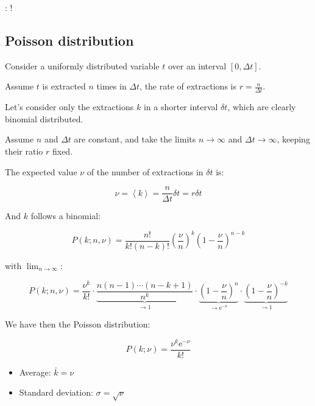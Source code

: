 : !

\subsection{Poisson distribution}
\label{subsec:poisson_distr}

Consider a uniformly distributed variable $t$ over an interval $[0, \Delta t]$.


Assume $t$ is extracted $n$ times in $\Delta t$, the rate of extractions is $r = \frac{n}{\Delta t}$.

Let's consider only the extractions $k$ in a shorter interval $\delta t$, which are clearly binomial distributed. 

Assume $n$ and $\Delta t$ are constant, and take the limits $n \to \infty$ and $\Delta t \to \infty$, keeping their ratio $r$ fixed.

The expected value $\nu$ of the number of extractions in $\delta t$ is:

$$
\nu = \left \langle k \right \rangle = \frac{n}{\Delta t} \delta t = r \delta t
$$

And $k$ follows a binomial:

$$
P(k ; n, \nu) = \frac{n!}{k!(n-k)!} {\left( \frac{\nu}{n} \right)}^{k} {\left( 1 - \frac{\nu}{n} \right)}^{n - k}
$$

with $\lim_{n \to \infty}$:

$$
P(k ; n, \nu) 
= \frac{\nu^{k}}{k!} 
\cdot \underset{\to 1}{\underbrace{\frac{n(n - 1) \cdots (n - k + 1)}{n^{k}}}}  
\cdot \underset{\to \mathrm{e}^{- \nu}}{\underbrace{{\left( 1 - \frac{\nu}{n} \right)}^{n}}} 
\cdot \underset{\to 1}{\underbrace{{\left( 1 - \frac{\nu}{n} \right)}^{- k}}}
$$

We have then the Poisson distribution:

\begin{equation}\label{eq:poisson_distr}
	P(k ; \nu) = \frac{\nu^{k} \mathrm{e}^{- \nu}}{k!}
\end{equation} 

\begin{itemize}
	\item Average: $\bar{k} = \nu$
	\item Standard deviation: $\sigma = \sqrt{\nu}$
\end{itemize}

